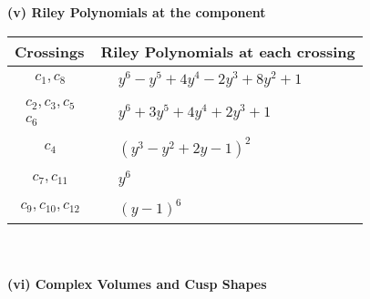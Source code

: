 \documentclass[1p]{elsarticle_modified}
\theoremstyle{definition}
\begin{document}
\newpage\renewcommand{\arraystretch}{1}
\flushleft \textbf{(v) Riley Polynomials at the component}\newline \\
\begin{tabular}{m{50pt}|m{274pt}}
Crossings & \hspace{64pt}Riley Polynomials at each crossing \\
\hline $$\begin{aligned}c_{1},c_{8}\end{aligned}$$&$\begin{aligned}
&y^6- y^5+4 y^4-2 y^3+8 y^2+1
\end{aligned}$\\
\hline $$\begin{aligned}c_{2},c_{3},c_{5}\\c_{6}\end{aligned}$$&$\begin{aligned}
&y^6+3 y^5+4 y^4+2 y^3+1
\end{aligned}$\\
\hline $$\begin{aligned}c_{4}\end{aligned}$$&$\begin{aligned}
&(y^3- y^2+2 y-1)^2
\end{aligned}$\\
\hline $$\begin{aligned}c_{7},c_{11}\end{aligned}$$&$\begin{aligned}
&y^6
\end{aligned}$\\
\hline $$\begin{aligned}c_{9},c_{10},c_{12}\end{aligned}$$&$\begin{aligned}
&(y-1)^6
\end{aligned}$\\
\hline
\end{tabular}\\~\\
\newpage\flushleft \textbf{(vi) Complex Volumes and Cusp Shapes}
\end{document}
